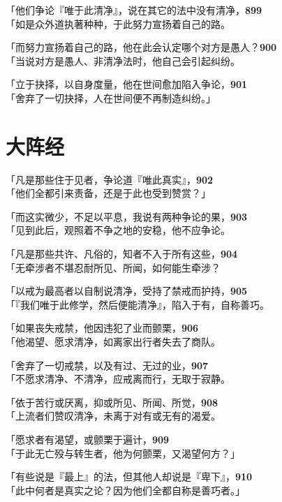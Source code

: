 「他们争论『唯于此清净』，说在其它的法中没有清净，\hfill{\grayfootnotesize \textbf{899}} \\
「如是众外道执著种种，于此努力宣扬着自己的路。


「而努力宣扬着自己的路，他在此会认定哪个对方是愚人？\hfill{\grayfootnotesize \textbf{900}} \\
「当说对方是愚人、非清净法时，他自己会引起纠纷。


「立于抉择，以自身度量，他在世间愈加陷入争论，\hfill{\grayfootnotesize \textbf{901}} \\
「舍弃了一切抉择，人在世间便不再制造纠纷。」


\section{大阵经}


「凡是那些住于见者，争论道『唯此真实』，\hfill{\grayfootnotesize \textbf{902}} \\
「他们全都引来责备，还是于此也受到赞赏？」


「而这实微少，不足以平息，我说有两种争论的果，\hfill{\grayfootnotesize \textbf{903}} \\
「见到此后，观照着不争之地的安稳，他不应争论。


「凡是那些共许、凡俗的，知者不入于所有这些，\hfill{\grayfootnotesize \textbf{904}} \\
「无牵涉者不堪忍耐所见、所闻，如何能生牵涉？


「以戒为最高者以自制说清净，受持了禁戒而护持，\hfill{\grayfootnotesize \textbf{905}} \\
「『我们唯于此修学，然后便能清净』，陷入于有，自称善巧。


「如果丧失戒禁，他因违犯了业而颤栗，\hfill{\grayfootnotesize \textbf{906}} \\
「他渴望、愿求清净，如离家出行者失去了商队。


「舍弃了一切戒禁，以及有过、无过的业，\hfill{\grayfootnotesize \textbf{907}} \\
「不愿求清净、不清净，应戒离而行，无取于寂静。


「依于苦行或厌离，抑或所见、所闻、所觉，\hfill{\grayfootnotesize \textbf{908}} \\
「上流者们赞叹清净，未离于对有或无有的渴爱。


「愿求者有渴望，或颤栗于遍计，\hfill{\grayfootnotesize \textbf{909}} \\
「于此无亡殁与转生者，他为何颤栗，又渴望何方？」


「有些说是『最上』的法，但其他人却说是『卑下』，\hfill{\grayfootnotesize \textbf{910}} \\
「此中何者是真实之论？因为他们全都自称是善巧者。」


